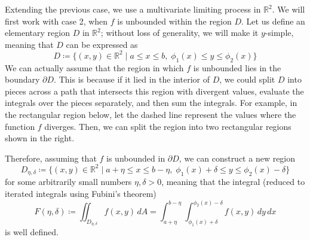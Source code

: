   Extending the previous case, we use a multivariate limiting process in $\mathbb{R}^2$. We will first work with case 2, when $f$ is unbounded within the region $D$. Let us define an elementary region $D$ in $\mathbb{R}^2$; without loss of generality, we will make it $y$-simple, meaning that $D$ can be expressed as
    \begin{equation}
      D \coloneqq \{ (x, y) \in \mathbb{R}^2 \; | \; a \leq x \leq b, \; \phi_1 (x) \leq y \leq \phi_2 (x)\}
    \end{equation}
  We can actually assume that the region in which $f$ is unbounded lies in the boundary $\partial D$. This is because if it lied in the interior of $D$, we could split $D$ into pieces across a path that intersects this region with divergent values, evaluate the integrals over the pieces separately, and then sum the integrals. For example, in the rectangular region below, let the dashed line represent the values where the function $f$ diverges. Then, we can split the region into two rectangular regions shown in the right. 
  \begin{center}
  \end{center}
  Therefore, assuming that $f$ is unbounded in $\partial D$, we can construct a new region 
  \begin{equation}
    D_{\eta, \delta} \coloneqq \{(x, y) \in \mathbb{R}^2 \; | \; a + \eta \leq x \leq b - \eta, \; \phi_1 (x) + \delta \leq y \leq \phi_2 (x) - \delta\}
  \end{equation}
  for some arbitrarily small numbers $\eta, \delta >0$, meaning that the integral (reduced to iterated integrals using Fubini's theorem) 
  \begin{equation}
    F(\eta, \delta) \coloneqq \iint_{D_{\eta, \delta}} f(x, y) \, dA = \int_{a + \eta}^{b - \eta} \int_{\phi_1 (x) + \delta}^{\phi_2 (x) - \delta} f(x, y) \, dy\,dx
  \end{equation}
  is well defined. 
  \begin{center}
  \end{center}
